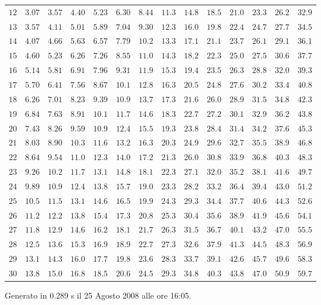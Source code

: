 \begin{table}[htb!]
\begin{center}
{\begin{tabular}{p{22 pt}ccccccccccccc}
$12$ & $3.07$ & $3.57$ & $4.40$ & $5.23$ & $6.30$ & $8.44$ & $11.3$ & $14.8$ & $18.5$ & $21.0$ & $23.3$ & $26.2$ & $32.9$\\
$13$ & $3.57$ & $4.11$ & $5.01$ & $5.89$ & $7.04$ & $9.30$ & $12.3$ & $16.0$ & $19.8$ & $22.4$ & $24.7$ & $27.7$ & $34.5$\\
$14$ & $4.07$ & $4.66$ & $5.63$ & $6.57$ & $7.79$ & $10.2$ & $13.3$ & $17.1$ & $21.1$ & $23.7$ & $26.1$ & $29.1$ & $36.1$\\
$15$ & $4.60$ & $5.23$ & $6.26$ & $7.26$ & $8.55$ & $11.0$ & $14.3$ & $18.2$ & $22.3$ & $25.0$ & $27.5$ & $30.6$ & $37.7$\\
$16$ & $5.14$ & $5.81$ & $6.91$ & $7.96$ & $9.31$ & $11.9$ & $15.3$ & $19.4$ & $23.5$ & $26.3$ & $28.8$ & $32.0$ & $39.3$\\
$17$ & $5.70$ & $6.41$ & $7.56$ & $8.67$ & $10.1$ & $12.8$ & $16.3$ & $20.5$ & $24.8$ & $27.6$ & $30.2$ & $33.4$ & $40.8$\\
$18$ & $6.26$ & $7.01$ & $8.23$ & $9.39$ & $10.9$ & $13.7$ & $17.3$ & $21.6$ & $26.0$ & $28.9$ & $31.5$ & $34.8$ & $42.3$\\
$19$ & $6.84$ & $7.63$ & $8.91$ & $10.1$ & $11.7$ & $14.6$ & $18.3$ & $22.7$ & $27.2$ & $30.1$ & $32.9$ & $36.2$ & $43.8$\\
$20$ & $7.43$ & $8.26$ & $9.59$ & $10.9$ & $12.4$ & $15.5$ & $19.3$ & $23.8$ & $28.4$ & $31.4$ & $34.2$ & $37.6$ & $45.3$\\
$21$ & $8.03$ & $8.90$ & $10.3$ & $11.6$ & $13.2$ & $16.3$ & $20.3$ & $24.9$ & $29.6$ & $32.7$ & $35.5$ & $38.9$ & $46.8$\\
$22$ & $8.64$ & $9.54$ & $11.0$ & $12.3$ & $14.0$ & $17.2$ & $21.3$ & $26.0$ & $30.8$ & $33.9$ & $36.8$ & $40.3$ & $48.3$\\
$23$ & $9.26$ & $10.2$ & $11.7$ & $13.1$ & $14.8$ & $18.1$ & $22.3$ & $27.1$ & $32.0$ & $35.2$ & $38.1$ & $41.6$ & $49.7$\\
$24$ & $9.89$ & $10.9$ & $12.4$ & $13.8$ & $15.7$ & $19.0$ & $23.3$ & $28.2$ & $33.2$ & $36.4$ & $39.4$ & $43.0$ & $51.2$\\
$25$ & $10.5$ & $11.5$ & $13.1$ & $14.6$ & $16.5$ & $19.9$ & $24.3$ & $29.3$ & $34.4$ & $37.7$ & $40.6$ & $44.3$ & $52.6$\\
$26$ & $11.2$ & $12.2$ & $13.8$ & $15.4$ & $17.3$ & $20.8$ & $25.3$ & $30.4$ & $35.6$ & $38.9$ & $41.9$ & $45.6$ & $54.1$\\
$27$ & $11.8$ & $12.9$ & $14.6$ & $16.2$ & $18.1$ & $21.7$ & $26.3$ & $31.5$ & $36.7$ & $40.1$ & $43.2$ & $47.0$ & $55.5$\\
$28$ & $12.5$ & $13.6$ & $15.3$ & $16.9$ & $18.9$ & $22.7$ & $27.3$ & $32.6$ & $37.9$ & $41.3$ & $44.5$ & $48.3$ & $56.9$\\
$29$ & $13.1$ & $14.3$ & $16.0$ & $17.7$ & $19.8$ & $23.6$ & $28.3$ & $33.7$ & $39.1$ & $42.6$ & $45.7$ & $49.6$ & $58.3$\\
$30$ & $13.8$ & $15.0$ & $16.8$ & $18.5$ & $20.6$ & $24.5$ & $29.3$ & $34.8$ & $40.3$ & $43.8$ & $47.0$ & $50.9$ & $59.7$\\
\hline

\end{tabular}
}
\end{center}
\end{table}
\vfill
\hfill {\scriptsize Generato in 0.289 s il 25 Agosto 2008 alle ore 16:05.}
